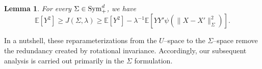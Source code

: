 \documentclass[sn-mathphys-num]{sn-jnl}%
\numberwithin{equation}{section}
\newcommand{\R}{\mathbb{R}}
\newcommand{\E}{\mathbb{E}}
\newtheorem{lemma}{Lemma}
\newcommand{\Sym}{{\rm \mathrm{Sym}}}
\theoremstyle{thmstyleone}%
\theoremstyle{thmstyletwo}%
\newtheorem{remark}{Remark}%
\theoremstyle{thmstylethree}%
\begin{document}
\vspace{.5em}
\begin{lemma}
\label{lemma:bounds-on-Sigma}
For every $\Sigma \in \Sym_+^d$, we have 
\begin{equation}
	\E[Y^2] \ge J(\Sigma, \lambda) \ge \E[Y^2] - \lambda^{-1} \E[YY' \psi(\|X-X'\|_\Sigma^2)].
\end{equation}
\end{lemma}

In a nutshell, these reparameterizations from the $U$–space to the $\Sigma$–space remove the redundancy created by rotational invariance. Accordingly, our subsequent analysis is carried out primarily in the $\Sigma$ formulation.












\end{document}
